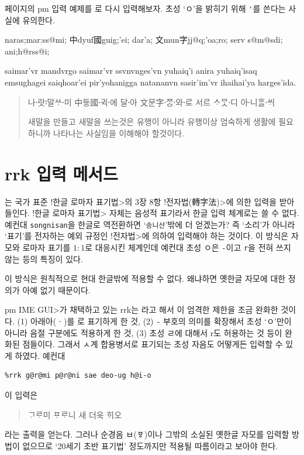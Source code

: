 \documentclass{simplman}
\newcommand*\pmime{\<3\textsf{pm IME GUI}>}
\let\opt\stopt
\begin{document}
\pageref{sec:pm}페이지의 pm 입력 예제를 \opt{mix}로 다시 입력해보자. 초성 `ㅇ'을
밝히기 위해 \verb|'|를 쓴다는 사실에 유의한다.
\begin{exampleonly}
naras;mar:ss@mi; 中dyuf國guig;'ei; dar'a;
文mun字jj@q;'oa;ro; serv s@m@sdi; ani;h@rss@i;

saimar'vr mandvrgo saimar'vr ssvnvnges'vn yuhaiq'i anira yuhaiq'isaq emsughagei saiqhoar'ei pir'yohanigga natananvn sasir'im'vr ihaihai'ya harges'ida.
\end{exampleonly}
\begin{quote}\exemfont
나랏〮말〯ᄊᆞ미〮 中듀ᇰ國귁〮에〮 달아〮
文문字ᄍᆞᆼ〮와〮로〮 서르 ᄉᆞᄆᆞᆺ디〮 아니〮ᄒᆞᆯᄊᆡ〮

새말을 만들고 새말을 쓰는것은 유행이 아니라 유행이상 엄숙하게 생활에 필요하니까 나타나는 사실임을 이해해야 할것이다.
\end{quote}


\section{rrk 입력 메서드}

\opt{rrk}는 국가 표준 \<!한글 로마자 표기법>의 3장 8항 \<!전자법(轉字法)>에 의한
입력을 받아들인다. \<!한글 로마자 표기법> 자체는 음성적 표기라서 한글 입력 체계로는
쓸 수 없다. 예컨대 \texttt{songnisan}을 한글로 역전환하면 `\texttt{송니산}'밖에
더 얻겠는가? 즉 `소리'가 아니라 `표기'를 전자하는 예외 규정인 \<!전자법>에 의하여
입력해야 하는 것이다. 이 방식은 자모와 로마자 표기를 $1:1$로 대응시킨 체계인데
예컨대 초성 ㅇ은 \verb|-|이고 \verb|r|을 전혀 쓰지 않는 등의 특징이 있다.

이 방식은 원칙적으로 현대 한글밖에 적용할 수 없다. 왜냐하면 옛한글 자모에 대한 정의가
아예 없기 때문이다. 

\pmime 가 채택하고 있는 rrk는 \opt{rrk-ex}라고 해서 이 엄격한 제한을 조금 완화한
것이다. (1) 아래아(ㆍ)를 \opt{@}로 표기하게 한 것, (2) \verb|-| 부호의 의미를 확장해서
초성 `ㅇ'만이 아니라 음절 구분에도 적용하게 한 것, (3) 초성 ㄹ에 대해서 r도 허용하는 것 등이
완화된 점들이다.
그래서 ㅅ계 합용병서로 표기되는 초성 자음도 어떻게든 입력할 수 있게 하였다. 예컨대
\begin{verbatim}
%rrk g@r@mi p@r@ni sae deo-ug h@i-o
\end{verbatim}
이 입력은 
\begin{quote}
ᄀᆞᄅᆞ미 ᄑᆞᄅᆞ니 새 더욱 ᄒᆡ오
\end{quote}
라는 출력을 얻는다. 그러나 순경음 ㅂ(ㅸ)이나 그밖의 소실된 옛한글 자모를 입력할 방법이 없으므로
`20세기 초반 표기법' 정도까지만 적용될 따름이라고 보아야 한다. 
\end{document}
